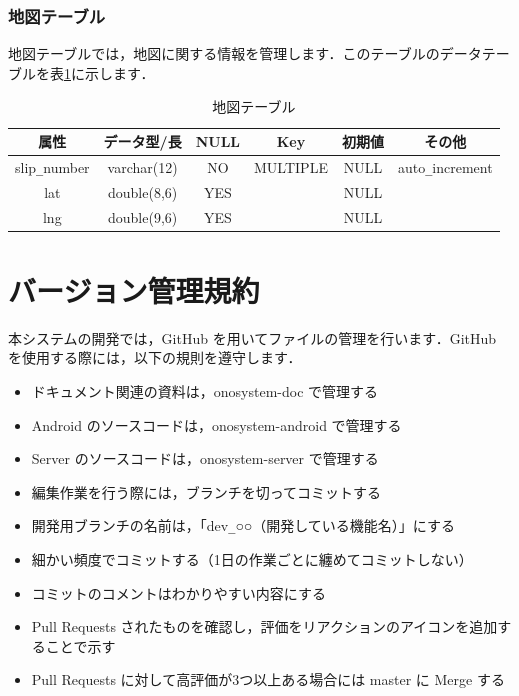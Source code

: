 \documentclass[a4j,titlepage]{jarticle}
\begin{document}
\subsubsection{地図テーブル}
地図テーブルでは，地図に関する情報を管理します．このテーブルのデータテーブルを表\ref{map}に示します．
\begin{table}[htb]
  \caption{地図テーブル}
  \label{map}
  \begin{center}
    \begin{tabular}{|c|c|c|c|c|c|} \hline
      属性 & データ型/長 & NULL & Key & 初期値 & その他 \\ \hline \hline
      slip\verb|_|number & varchar(12) & NO & MULTIPLE & NULL & auto\verb|_|increment\\ \hline
      lat & double(8,6) & YES &   & NULL & \\ \hline
      lng & double(9,6) & YES &   & NULL & \\ \hline
    \end{tabular}
  \end{center}
\end{table}


\section{バージョン管理規約}
本システムの開発では，GitHub を用いてファイルの管理を行います．GitHub を使用する際には，以下の規則を遵守します．
\begin{itemize}
\item ドキュメント関連の資料は，onosystem-doc で管理する
\item Android のソースコードは，onosystem-android で管理する
\item Server のソースコードは，onosystem-server で管理する
\item 編集作業を行う際には，ブランチを切ってコミットする
\item 開発用ブランチの名前は，「dev\verb|_|○○（開発している機能名）」にする
\item 細かい頻度でコミットする（1日の作業ごとに纏めてコミットしない）
\item コミットのコメントはわかりやすい内容にする
\item Pull Requests されたものを確認し，評価をリアクションのアイコンを追加することで示す
\item Pull Requests に対して高評価が3つ以上ある場合には master に Merge する
\end{itemize}
\end{document}
